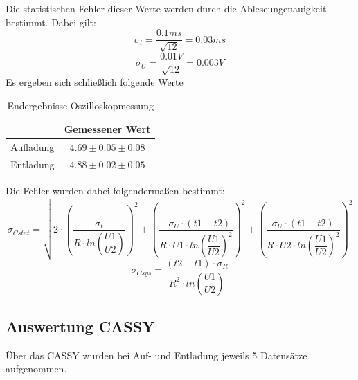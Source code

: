 \documentclass[12pt,a4paper]{article}
\begin{document}
Die statistischen Fehler dieser Werte werden durch die Ableseungenauigkeit bestimmt. Dabei gilt:
\begin{equation}
\sigma_t = \dfrac{0.1ms}{\sqrt{12}} = 0.03ms
\end{equation}
\begin{equation}
\sigma_U = \dfrac{0.01V}{\sqrt{12}} = 0.003V
\end{equation}
Es ergeben sich schließlich folgende Werte
\begin{table}[H]
\begin{center}
\begin{tabular}{|c|c|}
\hline 
 & Gemessener Wert \\ 
\hline 
Aufladung & $4.69\pm 0.05\pm 0.08$ \\ 
\hline 
Entladung & $4.88\pm 0.02\pm 0.05$ \\ 
\hline 
\end{tabular} 
\end{center}
\caption{Endergebnisse Oszilloskopmessung}
\end{table}
Die Fehler wurden dabei folgendermaßen bestimmt:
\begin{equation}
\sigma_{Cstat} = \sqrt{2\cdot\left(\dfrac{\sigma_t}{R\cdot ln(\dfrac{U1}{U2})}\right)^{2}+\left(\dfrac{-\sigma_U\cdot(t1-t2)}{R\cdot U1\cdot ln(\dfrac{U1}{U2})^{2}}\right)^{2}+\left(\dfrac{\sigma_U\cdot(t1-t2)}{R\cdot U2\cdot ln(\dfrac{U1}{U2})^{2}}\right)^{2}}
\end{equation}
\begin{equation}
\sigma_{Csys} = \dfrac{(t2-t1)\cdot \sigma_R}{R^{2}\cdot ln(\dfrac{U1}{U2})}
\end{equation}

\subsection{Auswertung CASSY}
Über das CASSY wurden bei Auf- und Entladung jeweils 5 Datensätze aufgenommen.
\end{document}
